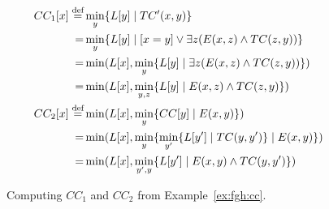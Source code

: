 \begin{figure}
\footnotesize
  \begin{align*}
    CC_1[x]  \stackrel{\text{def}}{=} & \min_y \{{L[y]}\mid{TC'(x,y)}\}\\
    = & \min_y \{{L[y]}\mid{[x=y] \vee \exists z(E(x,z) \wedge TC(z,y))}\}\\
    = & \min(L[x], \min_y\{{L[y]}\mid{\exists z(E(x,z) \wedge TC(z,y))}\})\\
    = & \min(L[x], \min_{y,z}\{{L[y]}\mid{E(x,z) \wedge TC(z,y)}\})\\
    CC_2[x] \stackrel{\text{def}}{=} & \min(L[x], \min_y \{{CC[y]}\mid{E(x,y)}\}) \\
    =  & \min(L[x], \min_y \{{\min_{y'} \{{L[y']}\mid{TC(y,y')}\}}\mid{E(x,y)}\})\\
    = & \min(L[x], \min_{y',y}\{{L[y']}\mid{E(x,y) \wedge TC(y,y')}\})
  \end{align*}
  \caption{Computing $CC_1$ and $CC_2$ from Example~\ref{ex:fgh:cc}.}
  \label{fig:cc1:cc2}
\end{figure}

% 
% 



